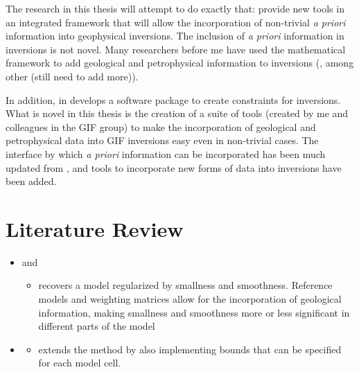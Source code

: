 The research in this thesis will attempt to do exactly that: provide new tools in an integrated framework that will allow the incorporation of non-trivial \emph{a priori} information into geophysical inversions. The inclusion of \emph{a priori} information in inversions is not novel. Many researchers before me have used the mathematical framework to add geological and petrophysical information to inversions (\citep{Lelievre2009Integrating},\citep{phillips2002geophysical} among other (still need to add more)). 

In addition, in \cite{williams2008geologically} develops a software package to create constraints for inversions. What is novel in this thesis is the creation of a suite of tools (created by me and colleagues in the \ac{GIF} group) to make the incorporation of geological and petrophysical data into \ac{GIF} inversions easy even in non-trivial cases. The interface by which \emph{a priori} information can be incorporated has been much updated from \citep{williams2008geologically}, and tools to incorporate new forms of data into inversions have been added.





\section{Literature Review}
\label{sec:Literature Review}

\begin{itemize}
\item \cite{19963} and \cite{li19983}
	\begin{itemize}
	\item recovers a model regularized by smallness and smoothness. Reference models and weighting matrices allow for the incorporation of geological information, making smallness and smoothness more or less significant in different parts of the model
	\end{itemize}
\item \cite{li2003fast} 
	\begin{itemize}
	\item extends the method by also implementing bounds that can be specified for each model cell.
	\end{itemize}	
\end{itemize}

